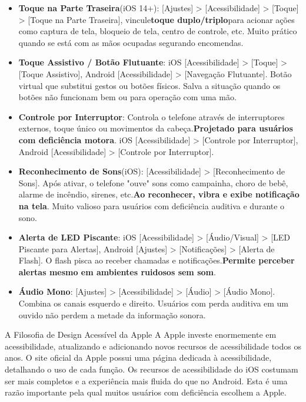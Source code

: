 \begin{itemize}
  \item \textbf{Toque na Parte Traseira}(iOS 14+): [Ajustes] > [Acessibilidade] > [Toque] > [Toque na Parte Traseira], vincule\textbf{toque duplo/triplo}para acionar ações como captura de tela, bloqueio de tela, centro de controle, etc. Muito prático quando se está com as mãos ocupadas segurando encomendas.
  \item \textbf{Toque Assistivo / Botão Flutuante}: iOS [Acessibilidade] > [Toque] > [Toque Assistivo], Android [Acessibilidade] > [Navegação Flutuante]. Botão virtual que substitui gestos ou botões físicos. Salva a situação quando os botões não funcionam bem ou para operação com uma mão.
  \item \textbf{Controle por Interruptor}: Controla o telefone através de interruptores externos, toque único ou movimentos da cabeça.\textbf{Projetado para usuários com deficiência motora}. iOS [Acessibilidade] > [Controle por Interruptor], Android [Acessibilidade] > [Controle por Interruptor].
  \item \textbf{Reconhecimento de Sons}(iOS): [Acessibilidade] > [Reconhecimento de Sons]. Após ativar, o telefone "ouve" sons como campainha, choro de bebê, alarme de incêndio, sirenes, etc.\textbf{Ao reconhecer, vibra e exibe notificação na tela}. Muito valioso para usuários com deficiência auditiva e durante o sono.
  \item \textbf{Alerta de LED Piscante}: iOS [Acessibilidade] > [Áudio/Visual] > [LED Piscante para Alertas], Android [Ajustes] > [Notificações] > [Alerta de Flash]. O flash pisca ao receber chamadas e notificações.\textbf{Permite perceber alertas mesmo em ambientes ruidosos sem som}.
  \item \textbf{Áudio Mono}: [Ajustes] > [Acessibilidade] > [Áudio] > [Áudio Mono]. Combina os canais esquerdo e direito. Usuários com perda auditiva em um ouvido não perdem a metade da informação sonora.
\end{itemize}

\begin{tcbinfo}{A Filosofia de Design Acessível da Apple}
A Apple investe enormemente em acessibilidade, atualizando e adicionando novos recursos de acessibilidade todos os anos. O site oficial da Apple possui uma página dedicada à acessibilidade, detalhando o uso de cada função. Os recursos de acessibilidade do iOS costumam ser mais completos e a experiência mais fluida do que no Android. Esta é uma razão importante pela qual muitos usuários com deficiência escolhem a Apple.

\end{tcbinfo}

